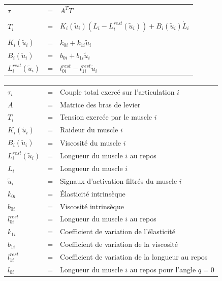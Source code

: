\documentclass[pdftex,a4paper,11pt]{article}
\begin{document}
\begin{tabular}{lcl}
    $\tau$ & = & $A^T T$ \\
    \\
    $T_i$                     & = & $K_i(\tilde{u}_i) (L_i - L_i^{rest}(\tilde{u}_i)) + B_i(\tilde{u}_i) \dot{L}_i$ \\
    \\
    $K_i(\tilde{u}_i)$        & = & $k_{0i} + k_{1i} \tilde{u}_i$ \\
    $B_i(\tilde{u}_i)$        & = & $b_{0i} + b_{1i} \tilde{u}_i$ \\
    $L_i^{rest}(\tilde{u}_i)$ & = & $ l_{0i}^{rest} - l_{1i}^{rest} \tilde{u}_i$ \\
\end{tabular}

\paragraph{}
\begin{tabular}{lcl}
    $\tau_i$ & = & Couple total exercé sur l'articulation $i$ \\
    $A$  & = & Matrice des bras de levier \\
    $T_i$  & = & Tension exercée par le muscle $i$ \\
    $K_i(\tilde{u}_i)$ & = & Raideur du muscle $i$ \\
    $B_i(\tilde{u}_i)$ & = & Viscosité du muscle $i$ \\
    $L_i^{rest}(\tilde{u}_i)$ & = & Longueur du muscle $i$ au repos \\
    $L_i$ & = & Longueur du muscle $i$ \\
    $\tilde{u}_i$ & = & Signaux d'activation filtrés du muscle $i$ \\
    $k_{0i}$ & = & Élasticité intrinsèque \\
    $b_{0i}$ & = & Viscosité intrinsèque \\
    $l^{rest}_{0i}$ & = & Longueur du muscle $i$ au repos \\
    $k_{1i}$ & = & Coefficient de variation de l'élasticité \\
    $b_{1i}$ & = & Coefficient de variation de la viscosité \\
    $l^{rest}_{1i}$ & = & Coefficient de variation de la longueur au repos \\
    $l_{0i}$ & = & Longueur du muscle $i$ au repos pour l'angle $q = 0$ \\
\end{tabular}
\end{document}
